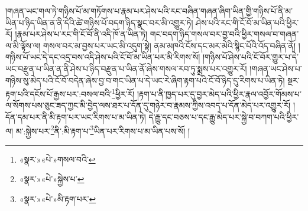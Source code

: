 །གཞན་ཡང་གལ་ཏེ་གཉིས་པོ་མ་གཏོགས་པ་རྣམ་པར་ཤེས་པའི་རང་བཞིན་གཞན་ཞིག་ཡིན་གྱི་གཉིས་པོ་ནི་མ་ཡིན་པ་ཉིད་ཡིན་ན་ནི་དེའི་ཚེ་གཉིས་པོ་བདག་ཉིད་སྣང་བར་མི་འགྱུར་ཏེ། ཤེས་པའི་རང་གི་ངོ་བོ་མ་ཡིན་པའི་ཕྱིར་རོ། །རྣམ་པར་ཤེས་པ་རང་གི་ངོ་བོ་ནི་འདི་ཁོ་ན་ཡིན་ཏེ། གང་བདག་ཉིད་གསལ་བར་བྱ་བའི་ཕྱིར་གསལ་བ་གཞན་ལ་མི་ལྟོས་ལ། གསལ་བར་མ་བྱས་པར་ཡང་མི་འདུག་སྟེ། ནམ་མཁའི་ངོས་དང་མར་མེའི་སྙིང་པོའི་འོད་བཞིན་ནོ། །གཉིས་པོ་ཡང་དེ་དང་འདྲ་བས་འདི་ཤེས་པའི་ངོ་བོ་མ་ཡིན་པར་མི་རིགས་སོ། །གཉིས་པོ་ཤེས་པའི་ངོ་བོར་གྱུར་པ་དེ་ཡང་བརྫུན་པ་ཡིན་ན་ནི་ཤེས་པ་ཉིད་བརྫུན་པ་ཡིན་ནོ་ཞེས་གསལ་རབ་ཏུ་སྨྲས་པར་འགྱུར་རོ། །གཞན་ཡང་ཤེས་པ་གཉིས་སུ་མེད་པའི་ངོ་བོ་བདེན་ཞེས་བྱ་བ་གང་ཡིན་པ་དེ་ཡང་རེ་ཞིག་རྟག་པའི་ངོ་བོ་ཉིད་དུ་རིགས་པ་ཡིན་ཏེ། སྔར་རྟག་པའི་དངོས་པོ་རྒྱས་པར་:བསལ་བའི་\footnote{«སྣར་»«པེ་»གསལ་བའི་}ཕྱིར་རོ། །རྟག་པ་ནི་ཁྱད་པར་དུ་བྱར་མེད་པའི་ཕྱིར་རྣལ་འབྱོར་གོམས་པ་ལ་སོགས་པས་ཅུང་ཟད་ཀྱང་མི་བྱེད་ལས་ཐར་པ་དོན་དུ་གཉེར་བ་རྣམས་ཀྱིས་འབད་པ་དོན་མེད་པར་འགྱུར་རོ། །དོན་དམ་པར་ནི་མི་རྟག་པར་ཡང་རིགས་པ་མ་ཡིན་ཏེ། དེ་རྒྱུ་དང་བཅས་པ་དང་རྒྱུ་མེད་པར་སྐྱེ་བ་བཀག་པའི་ཕྱིར་ལ། མ་:སྐྱེས་པར་\footnote{«སྣར་»«པེ་»སྐྱེས་པ་}ནི་:མི་རྟག་པ་\footnote{«སྣར་»«པེ་»མི་རྟག་པར་}ཡིན་པར་རིགས་པ་མ་ཡིན་པས་སོ། །
